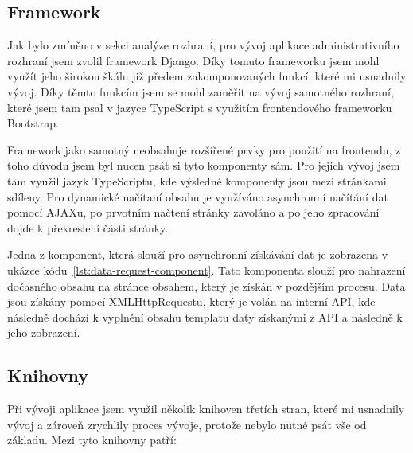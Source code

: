 \subsection{Framework}
\label{subsec:implementation-technologies-framework}
Jak bylo zmíněno v sekci analýze rozhraní, pro vývoj aplikace administrativního rozhraní jsem zvolil framework Django. Díky tomuto frameworku jsem mohl využít jeho širokou škálu již předem zakomponovaných funkcí, které mi usnadnily vývoj. Díky těmto funkcím jsem se mohl zaměřit na vývoj samotného rozhraní, které jsem tam psal v jazyce TypeScript s využitím frontendového frameworku Bootstrap.

Framework jako samotný neobsahuje rozšířené prvky pro použití na frontendu, z toho důvodu jsem byl nucen psát si tyto komponenty sám. Pro jejich vývoj jsem tam využil jazyk TypeScriptu, kde výsledné komponenty jsou mezi stránkami sdíleny. Pro dynamické načítaní obsahu je využíváno asynchronní načítání dat pomocí AJAXu, po prvotním načtení stránky zavoláno a po jeho zpracování dojde k překreslení části stránky.

Jedna z komponent, která slouží pro asynchronní získávání dat je zobrazena v ukázce kódu~\ref{lst:data-request-component}. Tato komponenta slouží pro nahrazení dočasného obsahu na stránce obsahem, který je získán v pozdějším procesu. Data jsou získány pomocí XMLHttpRequestu, který je volán na interní API, kde následně dochází k vyplnění obsahu templatu daty získanými z API a následně k jeho zobrazení.



\subsection{Knihovny}
\label{subsec:implementation-technologies-libraries}
Při vývoji aplikace jsem využil několik knihoven třetích stran, které mi usnadnily vývoj a zároveň zrychlily proces vývoje, protože nebylo nutné psát vše od základu. Mezi tyto knihovny patří:

